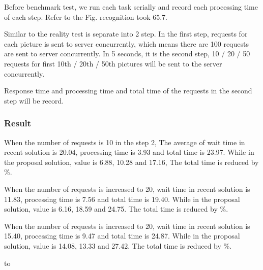 \documentclass[JIP]{ipsj}
\begin{document}
Before benchmark test, we run each task serially and record each processing time of each step. Refer to the Fig. recognition took 65.7.

Similar to the reality test is separate into 2 step. In the first step, requests for each picture is sent to server concurrently, which means there are 100 requests are sent to server concurrently.
In 5 seconds, it is the second step, 10 / 20 / 50 requests for first 10th / 20th / 50th pictures will be sent to the server concurrently.

Response time and processing time and total time of the requests in the second step will be record.


\subsubsection{Result}
When the number of requests is 10 in the step 2,
The average of wait time in recent solution is 20.04, processing time is 3.93 and total time is 23.97. While in the proposal solution, value is 6.88, 10.28 and 17.16, The total time is reduced by \%. 

When the number of requests is increased to 20,
wait time in recent solution is 11.83, processing time is 7.56 and total time is 19.40. While in the proposal solution, value is 6.16, 18.59 and 24.75. The total time is reduced by \%.

When the number of requests is increased to 20,
wait time in recent solution is 15.40, processing time is 9.47 and total time is 24.87. While in the proposal solution, value is 14.08, 13.33 and 27.42. The total time is reduced by \%.

\begin{table}[tb]
\caption{Statistics information of processing pictures.}
\label{tab:statistics}
	\hbox to
\end{table}
\end{document}
